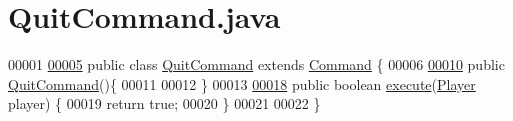 \hypertarget{QuitCommand_8java_source}{\section{Quit\-Command.\-java}
}

\begin{DoxyCode}
00001 
\hypertarget{QuitCommand_8java_source_l00005}{}\hyperlink{classQuitCommand}{00005} \textcolor{keyword}{public} \textcolor{keyword}{class }\hyperlink{classQuitCommand}{QuitCommand} \textcolor{keyword}{extends} \hyperlink{classCommand}{Command} \{
00006 
\hypertarget{QuitCommand_8java_source_l00010}{}\hyperlink{classQuitCommand_a3081011e681aabc33b470734f3a2d8f2}{00010}     \textcolor{keyword}{public} \hyperlink{classQuitCommand_a3081011e681aabc33b470734f3a2d8f2}{QuitCommand}()\{
00011 
00012     \}
00013 
\hypertarget{QuitCommand_8java_source_l00018}{}\hyperlink{classQuitCommand_aae6dc40d21d087738489b8ab5edcbc90}{00018}     \textcolor{keyword}{public} \textcolor{keywordtype}{boolean} \hyperlink{classQuitCommand_aae6dc40d21d087738489b8ab5edcbc90}{execute}(\hyperlink{classPlayer}{Player} player) \{
00019         \textcolor{keywordflow}{return} \textcolor{keyword}{true};
00020     \}
00021 
00022 \}
\end{DoxyCode}
